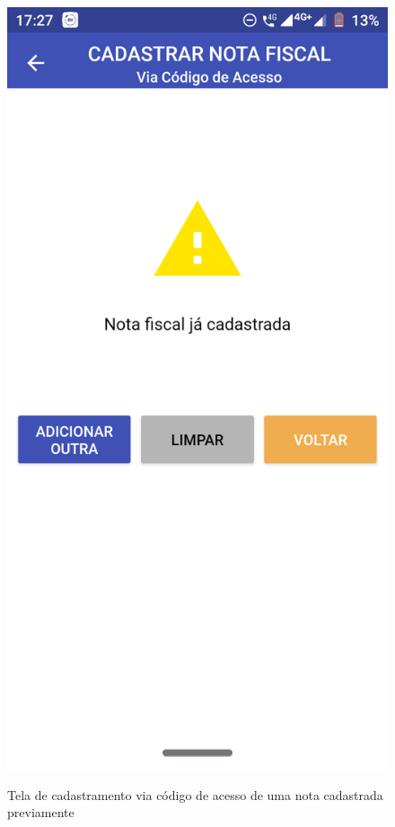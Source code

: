 \begin{figure}[h]
    \label{appCodigoAcessoSucessoFig}
\end{figure}

\newpage
\begin{figure}[h]
    \centering
    \caption{Tela de cadastramento via código de acesso de uma nota cadastrada previamente}
    \includegraphics[scale=0.15]{tcc/figures/app/app_codigo_acesso_ja_cadastrada.png}
    \label{appCodigoAcessoJaCadastradaFig}
\end{figure}


